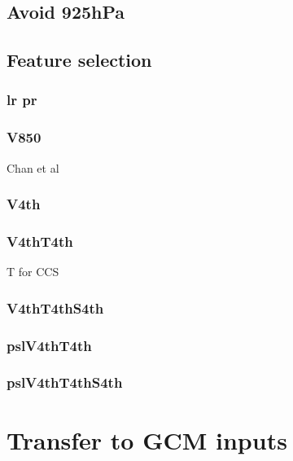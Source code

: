 \subsection{Avoid 925hPa}

\subsection{Feature selection}

\subsubsection{lr pr}

\subsubsection{V850}

Chan et al

\subsubsection{V4th}

\subsubsection{V4thT4th}

T for CCS

\subsubsection{V4thT4thS4th}

\subsubsection{pslV4thT4th}

\subsubsection{pslV4thT4thS4th}

\section{Transfer to GCM inputs}